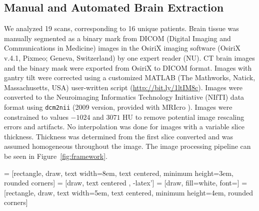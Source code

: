 \documentclass{elsarticle}\usepackage[]{graphicx}\usepackage[]{color}
\begin{document}

\subsection{Manual and Automated Brain Extraction}
We analyzed 19 scans, corresponding to 16 unique patients.  Brain tissue was manually segmented as a binary mark from DICOM (Digital Imaging and Communications in Medicine) images in the OsiriX imaging software (OsiriX v.4.1, Pixmeo; Geneva, Switzerland) by one expert reader (NU). 
CT brain images and the binary mask were exported from OsiriX to DICOM format.  Images with gantry tilt were corrected using a customized MATLAB (The Mathworks, Natick, Massachusetts, USA) user-written script (\url{http://bit.ly/1ltIM8c}). 
Images were converted to the Neuroimaging Informatics Technology Initiative (NIfTI) data format using \verb|dcm2nii| (2009 version, provided with MRIcro \citep{rorden_stereotaxic_2000}).  Images were constrained to values $-1024$ and $3071$ HU to remove potential image rescaling errors and artifacts.  No interpolation was done for images with a variable slice thickness. Thickness was determined from the first slice converted and was assumed homogeneous throughout the image.  The image processing pipeline can be seen in Figure~\ref{fig:framework}.



 = [rectangle, draw, text width=8em, text centered, minimum height=3em, rounded corners]
 = [draw, text centered , -latex']
 = [draw, fill=white, font=\tiny ]
 = [rectangle, draw, text width=5em, text centered, minimum height=4em, rounded corners]    
\end{document}
